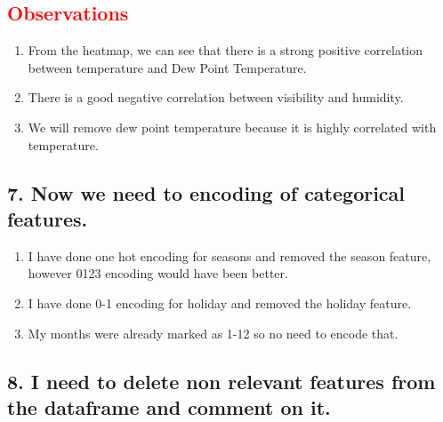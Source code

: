\documentclass[12pt, letterpaper]{article}
\begin{document}
\subsection*{\textcolor{red}{Observations}}
\begin{enumerate}
  \item From the heatmap, we can see that there is a strong positive correlation between temperature and Dew Point Temperature.
  \item There is a good negative correlation between visibility and humidity.
  \item We will remove dew point temperature because it is highly correlated with temperature.
\end{enumerate}

\newpage

\subsection*{7. Now we need to encoding of categorical features.}

\begin{enumerate}
  \item I have done one hot encoding for seasons and removed the season feature, however 0123 encoding would have been better.
  \item I have done 0-1 encoding for holiday and removed the holiday feature.
  \item My months were already marked as 1-12 so no need to encode that.
\end{enumerate}


\subsection*{8. I need to delete non relevant features from the dataframe and comment on it.}
\end{document}
